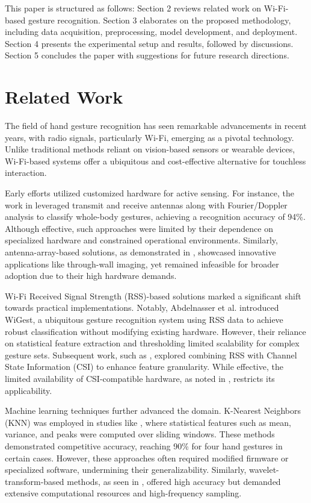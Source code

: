 \documentclass[10pt,twocolumn,letterpaper]{article}
\begin{document}
This paper is structured as follows: Section 2 reviews related work on Wi-Fi-based gesture recognition. Section 3 elaborates on the proposed methodology, including data acquisition, preprocessing, model development, and deployment. Section 4 presents the experimental setup and results, followed by discussions. Section 5 concludes the paper with suggestions for future research directions.



\section{Related Work}\label{sec:related}

The field of hand gesture recognition has seen remarkable advancements in recent years, with radio signals, particularly Wi-Fi, emerging as a pivotal technology. Unlike traditional methods reliant on vision-based sensors or wearable devices, Wi-Fi-based systems offer a ubiquitous and cost-effective alternative for touchless interaction.

Early efforts utilized customized hardware for active sensing. For instance, the work in \cite{sensor_based} leveraged transmit and receive antennas along with Fourier/Doppler analysis to classify whole-body gestures, achieving a recognition accuracy of 94\%. Although effective, such approaches were limited by their dependence on specialized hardware and constrained operational environments. Similarly, antenna-array-based solutions, as demonstrated in \cite{antenna_array}, showcased innovative applications like through-wall imaging, yet remained infeasible for broader adoption due to their high hardware demands.

Wi-Fi Received Signal Strength (RSS)-based solutions marked a significant shift towards practical implementations. Notably, Abdelnasser et al. \cite{abdelnasser2015wifi} introduced WiGest, a ubiquitous gesture recognition system using RSS data to achieve robust classification without modifying existing hardware. However, their reliance on statistical feature extraction and thresholding limited scalability for complex gesture sets. Subsequent work, such as \cite{rss_csi}, explored combining RSS with Channel State Information (CSI) to enhance feature granularity. While effective, the limited availability of CSI-compatible hardware, as noted in \cite{haseeb2020wisture}, restricts its applicability.

Machine learning techniques further advanced the domain. K-Nearest Neighbors (KNN) was employed in studies like \cite{knn1, knn2}, where statistical features such as mean, variance, and peaks were computed over sliding windows. These methods demonstrated competitive accuracy, reaching 90\% for four hand gestures in certain cases. However, these approaches often required modified firmware or specialized software, undermining their generalizability. Similarly, wavelet-transform-based methods, as seen in \cite{dwt_method}, offered high accuracy but demanded extensive computational resources and high-frequency sampling.
\end{document}
